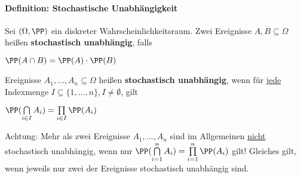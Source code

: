 \paragraph{Definition: Stochastische Unabhängigkeit}
Sei $(\Omega,\PP)$ ein diskreter Wahrscheinlichkeitsraum. Zwei Ereignisse $A,B\subseteq\Omega$ heißen \textbf{stochastisch unabhängig}, falls
\begin{tightcenter}
	$\PP(A\cap B)=\PP(A)\cdot\PP(B)$
\end{tightcenter}
\newpage
Ereignisse $A_1,\ldots,A_n\subseteq\Omega$ heißen \textbf{stochastisch unabhängig}, wenn für \underline{jede} Indexmenge $I\subseteq\{1,\ldots,n\},I\neq\emptyset$, gilt
\begin{tightcenter}
	$\PP(\bigcap\limits_{i\in I}A_i)=\prod\limits_{i\in I}\PP(A_i)$
\end{tightcenter}
Achtung: Mehr als zwei Ereignisse $A_1,\ldots,A_n$ sind im Allgemeinen \underline{nicht} stochastisch unabhängig, wenn nur $\PP(\bigcap\limits_{i=1}^{n}A_i)=\prod\limits_{i=1}^{n}\PP(A_i)$ gilt!
Gleiches gilt, wenn jeweils nur zwei der Ereignisse stochastisch unabhängig sind.
